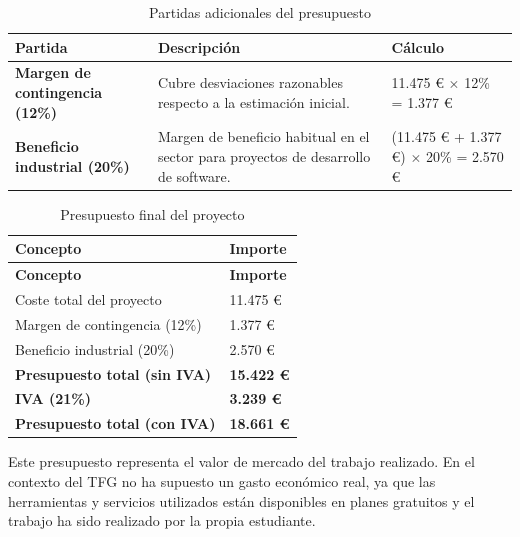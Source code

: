\begin{table}[H]
\centering
\caption{Partidas adicionales del presupuesto}
\label{tab:partidas_adicionales_presupuesto}
\begin{tabular}{p{5cm}p{5.5cm}p{3cm}}
\toprule
\textbf{Partida} & \textbf{Descripción} & \textbf{Cálculo} \\
\midrule
\textbf{Margen de contingencia (12\%)} & Cubre desviaciones razonables respecto a la estimación inicial. & 11.475 € $\times$ 12\% = 1.377 € \\
\textbf{Beneficio industrial (20\%)} & Margen de beneficio habitual en el sector para proyectos de desarrollo de software. & (11.475 € + 1.377 €) $\times$ 20\% = 2.570 € \\
\bottomrule
\end{tabular}
\end{table}

\begin{longtable}{p{8cm}p{4cm}}
\caption{Presupuesto final del proyecto}\label{tab:presupuesto_final}\\
\toprule
\textbf{Concepto} & \textbf{Importe} \\
\midrule
\endfirsthead
\toprule
\textbf{Concepto} & \textbf{Importe} \\
\midrule
\endhead
\bottomrule
\endlastfoot
Coste total del proyecto & 11.475 € \\
Margen de contingencia (12\%) & 1.377 € \\
Beneficio industrial (20\%) & 2.570 € \\
\midrule
\textbf{Presupuesto total (sin IVA)} & \textbf{15.422 €} \\
\textbf{IVA (21\%)} & \textbf{3.239 €} \\
\midrule
\textbf{Presupuesto total (con IVA)} & \textbf{18.661 €} \\
\end{longtable}

Este presupuesto representa el valor de mercado del trabajo realizado. En el contexto del TFG no ha supuesto un gasto económico real, ya que las herramientas y servicios utilizados están disponibles en planes gratuitos y el trabajo ha sido realizado por la propia estudiante.
